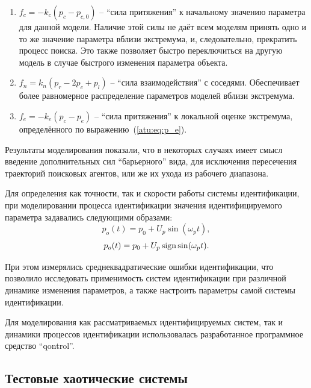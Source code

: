 \documentclass[a4paper,paratype,14pt,fouriernc]{dissatu}
\begin{document}
\begin{enumerate}
  \item
    $f_c = -k_c (p_c - p_{c,0}) $ -- ``сила притяжения'' к начальному значению
    параметра
    для данной модели. Наличие этой силы не даёт всем моделям принять одно
    и то же значение параметра вблизи экстремума, и, следовательно,
    прекратить процесс поиска. Это также позволяет быстро переключиться
    на другую модель в случае быстрого изменения параметра объекта.

  \item
    $f_n = k_n ( p_r - 2 p_c + p_l ) $ -- ``сила взаимодействия''
    с соседями. Обеспечивает более равномерное распределение
    параметров моделей вблизи экстремума.

  \item
    $f_e = - k_e ( p_c - p_e ) $ -- ``сила притяжения'' к локальной
    оценке экстремума, определённого по выражению~(\ref{atu:eq:p_e}).

\end{enumerate}

Результаты моделирования показали, что в некоторых случаях
имеет смысл введение дополнительных сил ``барьерного'' вида,
для исключения пересечения траекторий поисковых агентов, или же их ухода из рабочего диапазона.



Для определения как точности, так и скорости работы системы
идентификации, при моделировании процесса идентификации
значения идентифицируемого параметра задавались следующими образами:
%
\begin{equation}
  p_o(t) = p_0 +  U_{p} \sin( \omega_{p} t ),
  \label{atu:eq:p_sin}
\end{equation}
%
\begin{equation}
  p_o(t) = p_0 + U_{p} \operatorname*{sign} \sin( \omega_{p} t ).
  \label{atu:eq:p_sign}
\end{equation}

При этом измерялись среднеквадратические ошибки идентификации,
что позволило исследовать применимость систем идентификации
при различной динамике изменения параметров, а также
настроить параметры самой системы идентификации.

Для моделирования как рассматриваемых идентифицируемых систем,
так и динамики процессов идентификации использовалась разработанное
программное средство ``qontrol''.


\subsection*{Тестовые хаотические системы }
\end{document}
